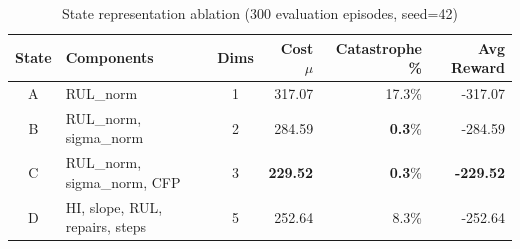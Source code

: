 \begin{table}[t]
\centering
\caption{State representation ablation (300 evaluation episodes, seed=42)}
\label{tab:state_ablation}
\begin{tabular}{clcrrr}
\toprule
\textbf{State} & \textbf{Components} & \textbf{Dims} & \textbf{Cost $\mu$} & \textbf{Catastrophe \%} & \textbf{Avg Reward} \\
\midrule
A & RUL_norm & 1 & 317.07 & 17.3\% & -317.07 \\
B & RUL_norm, sigma_norm & 2 & 284.59 & \textbf{0.3}\% & -284.59 \\
C & RUL_norm, sigma_norm, CFP & 3 & \textbf{229.52} & \textbf{0.3}\% & \textbf{-229.52} \\
D & HI, slope, RUL, repairs, steps & 5 & 252.64 & 8.3\% & -252.64   %
\bottomrule
\end{tabular}
\end{table}
